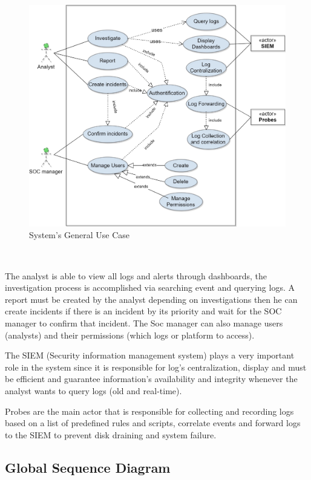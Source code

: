 \begin{figure}[htbp!]
\begin{center}
\includegraphics[width=5.5 in]{images/ATHENAusecaseDiagram.jpg}
\caption{System’s General Use Case}
\label{usecase}
\end{center}
\end{figure}  ~

\newpage

The analyst is able to view all logs and alerts through dashboards, the investigation process is accomplished via searching event and querying logs. 
A report must be created by the analyst depending on investigations then he can create incidents if there is an incident by its priority and wait for the SOC manager to confirm that incident.
The Soc manager can also manage users (analysts) and their permissions (which logs or platform to access).

The SIEM (Security information management system) plays a very important role in the system since it is responsible for log's centralization, display and must be efficient and guarantee information's availability and integrity whenever the analyst wants to query logs (old and real-time).

Probes are the main actor that is responsible for collecting and recording logs based on a list of predefined rules and scripts, correlate events and forward logs to the SIEM to prevent disk draining and system failure.

\subsection{Global Sequence Diagram}

